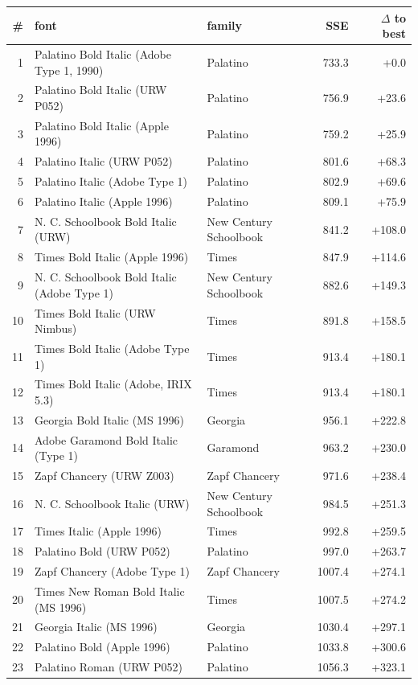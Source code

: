\begin{tabular}{rllrr}\toprule
\# & font & family & SSE & $\Delta$ to best \\ \midrule
1 & Palatino Bold Italic (Adobe Type 1, 1990) & Palatino & 733.3 & +0.0 \\
2 & Palatino Bold Italic (URW P052) & Palatino & 756.9 & +23.6 \\
3 & Palatino Bold Italic (Apple 1996) & Palatino & 759.2 & +25.9 \\
4 & Palatino Italic (URW P052) & Palatino & 801.6 & +68.3 \\
5 & Palatino Italic (Adobe Type 1) & Palatino & 802.9 & +69.6 \\
6 & Palatino Italic (Apple 1996) & Palatino & 809.1 & +75.9 \\
7 & N. C. Schoolbook Bold Italic (URW) & New Century Schoolbook & 841.2 & +108.0 \\
8 & Times Bold Italic (Apple 1996) & Times & 847.9 & +114.6 \\
9 & N. C. Schoolbook Bold Italic (Adobe Type 1) & New Century Schoolbook & 882.6 & +149.3 \\
10 & Times Bold Italic (URW Nimbus) & Times & 891.8 & +158.5 \\
11 & Times Bold Italic (Adobe Type 1) & Times & 913.4 & +180.1 \\
12 & Times Bold Italic (Adobe, IRIX 5.3) & Times & 913.4 & +180.1 \\
13 & Georgia Bold Italic (MS 1996) & Georgia & 956.1 & +222.8 \\
14 & Adobe Garamond Bold Italic (Type 1) & Garamond & 963.2 & +230.0 \\
15 & Zapf Chancery (URW Z003) & Zapf Chancery & 971.6 & +238.4 \\
16 & N. C. Schoolbook Italic (URW) & New Century Schoolbook & 984.5 & +251.3 \\
17 & Times Italic (Apple 1996) & Times & 992.8 & +259.5 \\
18 & Palatino Bold (URW P052) & Palatino & 997.0 & +263.7 \\
19 & Zapf Chancery (Adobe Type 1) & Zapf Chancery & 1007.4 & +274.1 \\
20 & Times New Roman Bold Italic (MS 1996) & Times & 1007.5 & +274.2 \\
21 & Georgia Italic (MS 1996) & Georgia & 1030.4 & +297.1 \\
22 & Palatino Bold (Apple 1996) & Palatino & 1033.8 & +300.6 \\
23 & Palatino Roman (URW P052) & Palatino & 1056.3 & +323.1 \\

\end{tabular}
